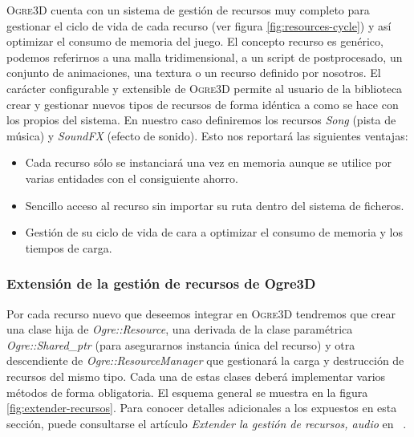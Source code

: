 
\textsc{Ogre3D} cuenta con un sistema de gestión de recursos muy completo
para gestionar el ciclo de vida de cada recurso (ver figura \ref{fig:resources-cycle})
y así optimizar el consumo de memoria del juego. El concepto recurso es
genérico, podemos referirnos a una malla tridimensional, a un script de
postprocesado, un conjunto de animaciones, una textura o un recurso
definido por nosotros. El carácter configurable y extensible de \textsc{Ogre3D}
permite al usuario de la biblioteca crear y gestionar nuevos tipos
de recursos de forma idéntica a como se hace con los propios del sistema.
En nuestro caso definiremos los recursos \textit{Song} (pista de música)
y \textit{SoundFX} (efecto de sonido). Esto nos reportará las siguientes
ventajas:

\begin{itemize}
    \itemsep0em
    \item Cada recurso sólo se instanciará una vez en memoria aunque se utilice
    por varias entidades con el consiguiente ahorro.
    \item Sencillo acceso al recurso sin importar su ruta dentro del sistema
    de ficheros.
    \item Gestión de su ciclo de vida de cara a optimizar el consumo de memoria
    y los tiempos de carga.
\end{itemize}

\subsubsection{Extensión de la gestión de recursos de Ogre3D}

Por cada recurso nuevo que deseemos integrar en \textsc{Ogre3D} tendremos
que crear una clase hija de \textit{Ogre::Resource}, una derivada de la
clase paramétrica \textit{Ogre::Shared\_ptr} (para asegurarnos instancia
única del recurso) y otra descendiente de \textit{Ogre::ResourceManager}
que gestionará la carga y destrucción de recursos del mismo tipo. Cada
una de estas clases deberá implementar varios métodos de forma obligatoria.
El esquema general se muestra en la figura \ref{fig:extender-recursos}.
Para conocer detalles adicionales a los expuestos en esta sección, puede
consultarse el artículo \textit{Extender la gestión de recursos, audio}
en \wiki\ \cite{website:recursos-iberogre}.\\

